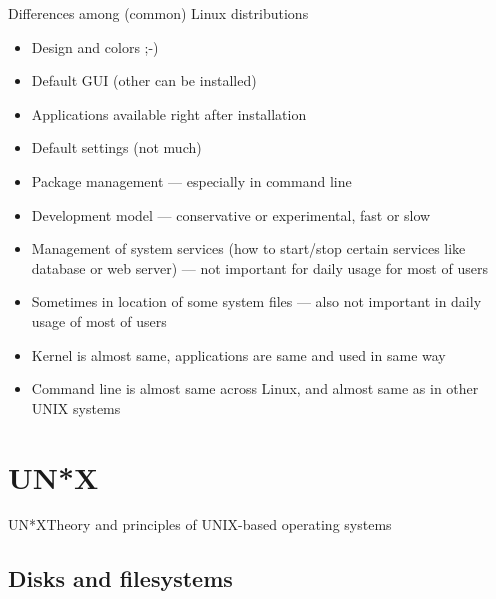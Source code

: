\documentclass[compress, ucs, xelatex, 11pt, xcolor=svgnames,
  hyperref={
    bookmarks=true,
    unicode=true,
    colorlinks=true,
    pdftitle={Linux, command line and MetaCentrum},
    plainpages=false,
    pdfauthor={Vojtech Zeisek},
    pdfsubject={Course about use of Linux command line, writing shell scripts and using MetaCentrum of CESNET},
    pdfcreator={XeLaTeX},
    pdfkeywords={Linux, GNU, BASH, shell, command line, MetaCentrum},
    linkcolor=DarkRed,
    anchorcolor=DarkBlue,
    citecolor=Indigo,
    filecolor=NavyBlue,
    menucolor=DarkMagenta,
    urlcolor=DarkBlue,
    pdftex},
  url={hyphens, lowtilde} %
  ]{beamer}
\begin{document}
\begin{frame}{Differences among (common) Linux distributions}
  \begin{itemize}
    \item Design and colors ;-)
    \item Default GUI (other can be installed)
    \item Applications available right after installation
    \item Default settings (not much)
    \item Package management --- especially in command line
    \item Development model --- conservative or experimental, fast or slow
    \item Management of system services (how to start/stop certain services like database or web server) --- not important for daily usage for most of users
    \item Sometimes in location of some system files --- also not important in daily usage of most of users
    \item Kernel is almost same, applications are same and used in same way
    \item Command line is almost same across Linux, and almost same as in other UNIX systems
  \end{itemize}
\end{frame}

\section{UN*X}

\begin{frame}{UN*X}{Theory and principles of UNIX-based operating systems}
  \tableofcontents[currentsection, sectionstyle=show/hide, hideothersubsections]
\end{frame}

\subsection{Disks and filesystems}
\end{document}
